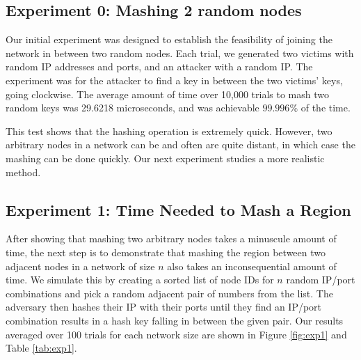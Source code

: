 \documentclass[11pt,conference]{IEEEtran}
\begin{document}




\subsection{Experiment 0: Mashing 2 random nodes}
Our initial experiment was designed to establish the feasibility of joining the network in between two random nodes.
Each trial, we generated two victims with random IP addresses and ports, and an attacker with a random IP.
The experiment was for the attacker to find a key in between the two victims' keys, going clockwise.
The average amount of time over 10,000 trials to mash two random keys was 29.6218 microseconds, and was achievable $ 99.996\%$ of the time.

This test shows that the hashing operation is extremely quick.
However, two arbitrary nodes in a network can be and often are quite distant, in which case the mashing can be done quickly.
Our next experiment studies a more realistic method.


\subsection{Experiment 1:  Time Needed to Mash a Region}
\label{sec:exp1}
After showing that mashing two arbitrary nodes takes a minuscule amount of time, the next step is to demonstrate that mashing the region between two adjacent nodes in a network of size $n$ also takes an inconsequential amount of time.
We simulate this by creating a sorted list of node IDs for $n$ random IP/port combinations and pick a random adjacent pair of numbers from the list.
The adversary then hashes their IP with their ports until they find an IP/port combination results in a hash key falling in between the given pair.
Our results averaged over 100 trials for each network size are shown in Figure \ref{fig:exp1} and Table \ref{tab:exp1}.
\end{document}
